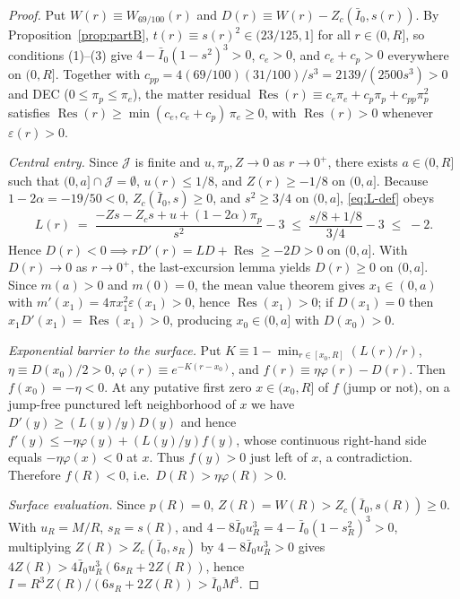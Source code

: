 \documentclass[11pt]{article}
\theoremstyle{plain}
\theoremstyle{definition}
\newcommand{\eps}{\varepsilon}
\newcommand{\Ibar}{\bar{I}}
\begin{document}
\begin{proof}
Put $W(r) \equiv W_{69/100}(r)$ and $D(r) \equiv W(r) - Z_c(\Ibar_0, s(r))$. By Proposition~\ref{prop:partB}, $t(r) \equiv s(r)^2 \in (23/125, 1]$ for all $r \in (0, R]$, so conditions (1)--(3) give $4 - \Ibar_0(1 - s^2)^3 > 0$, $c_e > 0$, and $c_e + c_p > 0$ everywhere on $(0, R]$. Together with $c_{pp} = 4(69/100)(31/100)/s^3 = 2139/(2500 s^3) > 0$ and DEC ($0 \le \pi_p \le \pi_e$), the matter residual $\operatorname{Res}(r) \equiv c_e \pi_e + c_p \pi_p + c_{pp} \pi_p^2$ satisfies $\operatorname{Res}(r) \ge \min(c_e, c_e + c_p)\,\pi_e \ge 0$, with $\operatorname{Res}(r) > 0$ whenever $\eps(r) > 0$.

\emph{Central entry.} Since $\mathcal{J}$ is finite and $u, \pi_p, Z \to 0$ as $r \to 0^+$, there exists $a \in (0, R]$ such that $(0, a] \cap \mathcal{J} = \emptyset$, $u(r) \le 1/8$, and $Z(r) \ge -1/8$ on $(0, a]$. Because $1 - 2\alpha = -19/50 < 0$, $Z_c(\Ibar_0, s) \ge 0$, and $s^2 \ge 3/4$ on $(0, a]$, \eqref{eq:L-def} obeys
\[
  L(r) \;=\; \frac{-Z s - Z_c s + u + (1 - 2\alpha)\pi_p}{s^2} - 3 \;\le\; \frac{s/8 + 1/8}{3/4} - 3 \;\le\; -2.
\]
Hence $D(r) < 0 \implies r D'(r) = L D + \operatorname{Res} \ge -2 D > 0$ on $(0, a]$. With $D(r) \to 0$ as $r \to 0^+$, the last-excursion lemma yields $D(r) \ge 0$ on $(0, a]$. Since $m(a) > 0$ and $m(0) = 0$, the mean value theorem gives $x_1 \in (0, a)$ with $m'(x_1) = 4\pi x_1^2 \eps(x_1) > 0$, hence $\operatorname{Res}(x_1) > 0$; if $D(x_1) = 0$ then $x_1 D'(x_1) = \operatorname{Res}(x_1) > 0$, producing $x_0 \in (0, a]$ with $D(x_0) > 0$.

\emph{Exponential barrier to the surface.} Put $K \equiv 1 - \min_{r \in [x_0, R]} (L(r)/r)$, $\eta \equiv D(x_0)/2 > 0$, $\varphi(r) \equiv e^{-K(r - x_0)}$, and $f(r) \equiv \eta \varphi(r) - D(r)$. Then $f(x_0) = -\eta < 0$. At any putative first zero $x \in (x_0, R]$ of $f$ (jump or not), on a jump-free punctured left neighborhood of $x$ we have $D'(y) \ge (L(y)/y) D(y)$ and hence $f'(y) \le -\eta \varphi(y) + (L(y)/y) f(y)$, whose continuous right-hand side equals $-\eta \varphi(x) < 0$ at $x$. Thus $f(y) > 0$ just left of $x$, a contradiction. Therefore $f(R) < 0$, i.e.\ $D(R) > \eta \varphi(R) > 0$.

\emph{Surface evaluation.} Since $p(R) = 0$, $Z(R) = W(R) > Z_c(\Ibar_0, s(R)) \ge 0$. With $u_R = M/R$, $s_R = s(R)$, and $4 - 8\Ibar_0 u_R^3 = 4 - \Ibar_0(1 - s_R^2)^3 > 0$, multiplying $Z(R) > Z_c(\Ibar_0, s_R)$ by $4 - 8\Ibar_0 u_R^3 > 0$ gives $4 Z(R) > 4 \Ibar_0 u_R^3(6 s_R + 2 Z(R))$, hence $I = R^3 Z(R)/(6 s_R + 2 Z(R)) > \Ibar_0 M^3$.
\end{proof}
\end{document}

